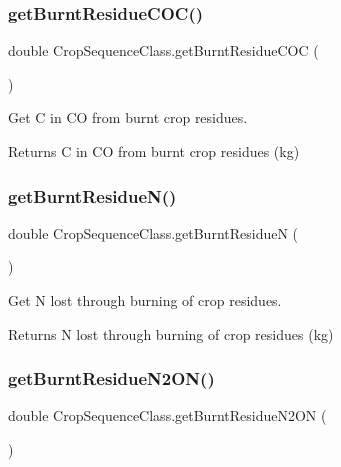 \subsubsection{\texorpdfstring{getBurntResidueCOC()}{getBurntResidueCOC()}}
{\footnotesize\ttfamily double Crop\+Sequence\+Class.\+get\+Burnt\+Residue\+C\+OC (\begin{DoxyParamCaption}{ }\end{DoxyParamCaption})\hspace{0.3cm}{\ttfamily [inline]}}



Get C in CO from burnt crop residues. 

\begin{DoxyReturn}{Returns}
C in CO from burnt crop residues (kg) 
\end{DoxyReturn}
\mbox{\label{class_crop_sequence_class_a2c887c3ec30b6911a3444db4d9b116e2}} 
\subsubsection{\texorpdfstring{getBurntResidueN()}{getBurntResidueN()}}
{\footnotesize\ttfamily double Crop\+Sequence\+Class.\+get\+Burnt\+ResidueN (\begin{DoxyParamCaption}{ }\end{DoxyParamCaption})\hspace{0.3cm}{\ttfamily [inline]}}



Get N lost through burning of crop residues. 

\begin{DoxyReturn}{Returns}
N lost through burning of crop residues (kg) 
\end{DoxyReturn}
\mbox{\label{class_crop_sequence_class_ad20b3689a946352cf147d57e2c22d069}} 
\subsubsection{\texorpdfstring{getBurntResidueN2ON()}{getBurntResidueN2ON()}}
{\footnotesize\ttfamily double Crop\+Sequence\+Class.\+get\+Burnt\+Residue\+N2\+ON (\begin{DoxyParamCaption}{ }\end{DoxyParamCaption})\hspace{0.3cm}{\ttfamily [inline]}}



